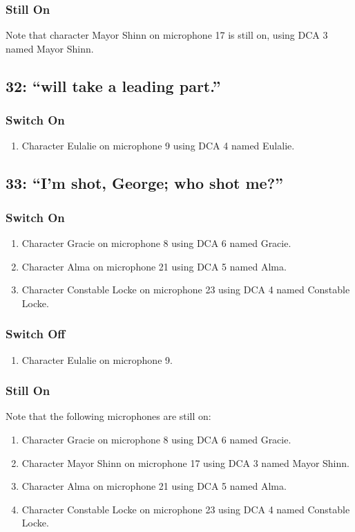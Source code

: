 \subsubsection* {Still On}
Note that character Mayor Shinn on microphone 17 is still on, using DCA 3 named Mayor Shinn.\subsection* {32: ``will take a leading part.''}
\subsubsection* {Switch On}
\begin{enumerate}
\item Character Eulalie on microphone 9 using DCA 4 named Eulalie.
\end{enumerate}
\subsection* {33: ``I'm shot, George; who shot me?''}
\subsubsection* {Switch On}
\begin{enumerate}
\item Character Gracie on microphone 8 using DCA 6 named Gracie.
\item Character Alma on microphone 21 using DCA 5 named Alma.
\item Character Constable Locke on microphone 23 using DCA 4 named Constable Locke.
\end{enumerate}
\subsubsection* {Switch Off}
\begin{enumerate}
\item Character Eulalie on microphone 9.
\end{enumerate}
\subsubsection* {Still On}
Note that the following microphones are still on:
\begin{enumerate}
\item Character Gracie on microphone 8 using DCA 6 named Gracie.
\item Character Mayor Shinn on microphone 17 using DCA 3 named Mayor Shinn.
\item Character Alma on microphone 21 using DCA 5 named Alma.
\item Character Constable Locke on microphone 23 using DCA 4 named Constable Locke.
\end{enumerate}

